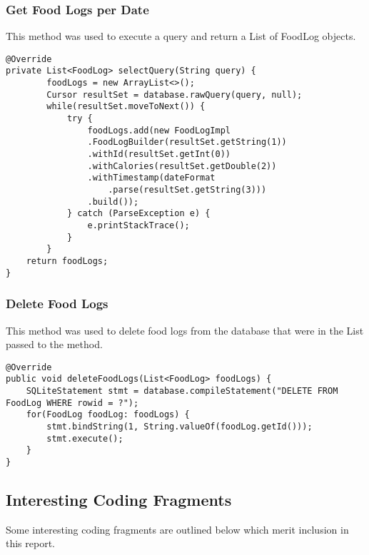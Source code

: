\tocless\subsubsection{Get Food Logs per Date}
This method was used to execute a query and return a List of FoodLog objects.
\begin{lstlisting}[style=Java]
@Override
private List<FoodLog> selectQuery(String query) {
        foodLogs = new ArrayList<>();
        Cursor resultSet = database.rawQuery(query, null);
        while(resultSet.moveToNext()) {
            try {
                foodLogs.add(new FoodLogImpl
                .FoodLogBuilder(resultSet.getString(1))
                .withId(resultSet.getInt(0))
                .withCalories(resultSet.getDouble(2))
                .withTimestamp(dateFormat
                    .parse(resultSet.getString(3)))
                .build());
            } catch (ParseException e) {
                e.printStackTrace();
            }
        }
    return foodLogs;
}
\end{lstlisting}

\tocless\subsubsection{Delete Food Logs}
This method was used to delete food logs from the database that were in the List passed to the method.
\begin{lstlisting}[style=Java]
@Override
public void deleteFoodLogs(List<FoodLog> foodLogs) {
    SQLiteStatement stmt = database.compileStatement("DELETE FROM FoodLog WHERE rowid = ?");
    for(FoodLog foodLog: foodLogs) {
        stmt.bindString(1, String.valueOf(foodLog.getId()));
        stmt.execute();
    }
}
\end{lstlisting}

\tocless\subsection{Interesting Coding Fragments}
Some interesting coding fragments are outlined below which merit inclusion in this report.


